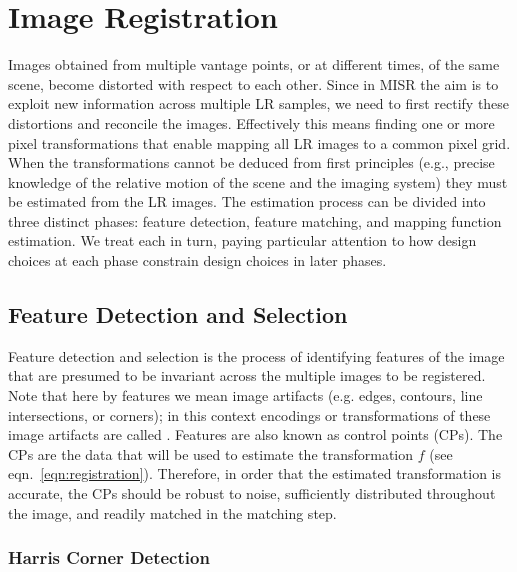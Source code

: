 \section{Image Registration}\label{sec:registration}
\localtableofcontents

Images obtained from multiple vantage points, or at different times, of the same scene, become distorted with respect to each other.
%
Since in MISR the aim is to exploit new information across multiple LR samples, we need to first rectify these distortions and reconcile the images.
%
Effectively this means finding one or more pixel transformations that enable mapping all LR images to a common pixel grid.
%
When the transformations cannot be deduced from first principles (e.g., precise knowledge of the relative motion of the scene and the imaging system) they must be estimated from the LR images.
%
The estimation process can be divided into three distinct phases: feature detection, feature matching, and mapping function estimation. We treat each in turn, paying particular attention to how design choices at each phase constrain design choices in later phases.

\subsection{Feature Detection and Selection}\label{sec:featdetec}

Feature detection and selection is the process of identifying features of the image that are presumed to be invariant across the multiple images to be registered.
%
Note that here by features we mean image artifacts (e.g. edges, contours, line intersections, or corners); in this context encodings or transformations of these image artifacts are called .
%
Features are also known as control points (CPs).
%
The CPs are the data that will be used to estimate the transformation \(f\) (see eqn.~\eqref{eqn:registration}).
%
Therefore, in order that the estimated transformation is accurate, the CPs should be robust to noise, sufficiently distributed throughout the image, and readily matched in the matching step.

\subsubsection{Harris Corner Detection}

